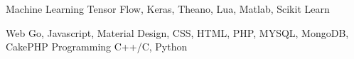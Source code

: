 

\begin{cvskills}

  \cvskill
    {Machine Learning} %
    {Tensor Flow, Keras, Theano, Lua, Matlab, Scikit Learn} %

  \cvskill
    {Web} %
    {Go, Javascript, Material Design, CSS, HTML, PHP, MYSQL, MongoDB, CakePHP} %
	\cvskill
	{Programming} %
	{C++/C, Python} %

\end{cvskills}

